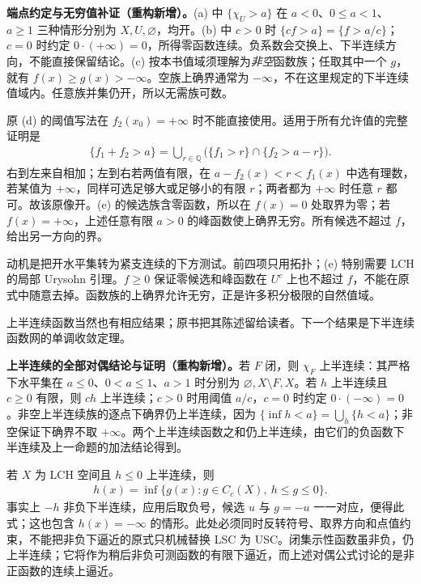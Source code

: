 \documentclass[../../main.tex]{subfiles}
\begin{document}
\begin{remark}
\textbf{端点约定与无穷值补证（重构新增）。}(a) 中 $\{\chi_U>a\}$ 在 $a<0$、$0\leqslant a<1$、$a\geqslant1$ 三种情形分别为 $X,U,\varnothing$，均开。(b) 中 $c>0$ 时 $\{cf>a\}=\{f>a/c\}$；$c=0$ 时约定 $0\cdot(+\infty)=0$，所得零函数连续。负系数会交换上、下半连续方向，不能直接保留结论。(c) 按本书值域须理解为\emph{非空}函数族；任取其中一个 $g$，就有 $f(x)\geqslant g(x)>-\infty$。空族上确界通常为 $-\infty$，不在这里规定的下半连续值域内。任意族并集仍开，所以无需族可数。

原 (d) 的阈值写法在 $f_2(x_0)=+\infty$ 时不能直接使用。适用于所有允许值的完整证明是
\begin{align*}
\{f_1+f_2>a\}=\bigcup_{r\in\mathbb Q}\bigl(\{f_1>r\}\cap\{f_2>a-r\}\bigr).
\end{align*}
右到左来自相加；左到右若两值有限，在 $a-f_2(x)<r<f_1(x)$ 中选有理数，若某值为 $+\infty$，同样可选足够大或足够小的有限 $r$；两者都为 $+\infty$ 时任意 $r$ 都可。故该原像开。(e) 的候选族含零函数，所以在 $f(x)=0$ 处取界为零；若 $f(x)=+\infty$，上述任意有限 $a>0$ 的峰函数使上确界无穷。所有候选不超过 $f$，给出另一方向的界。

动机是把开水平集转为紧支连续的下方测试。前四项只用拓扑；(e) 特别需要 LCH 的局部 Urysohn 引理。$f\geqslant0$ 保证零候选和峰函数在 $U^c$ 上也不超过 $f$，不能在原式中随意去掉。函数族的上确界允许无穷，正是许多积分极限的自然值域。
\end{remark}

上半连续函数当然也有相应结果；原书把其陈述留给读者。下一个结果是下半连续函数网的单调收敛定理。
\begin{remark}
\textbf{上半连续的全部对偶结论与证明（重构新增）。}若 $F$ 闭，则 $\chi_F$ 上半连续：其严格下水平集在 $a\leqslant0$、$0<a\leqslant1$、$a>1$ 时分别为 $\varnothing,X\setminus F,X$。若 $h$ 上半连续且 $c\geqslant0$ 有限，则 $ch$ 上半连续；$c>0$ 时用阈值 $a/c$，$c=0$ 时约定 $0\cdot(-\infty)=0$。非空上半连续族的逐点下确界仍上半连续，因为 $\{\inf h<a\}=\bigcup_h\{h<a\}$；非空保证下确界不取 $+\infty$。两个上半连续函数之和仍上半连续，由它们的负函数下半连续及上一命题的加法结论得到。

若 $X$ 为 LCH 空间且 $h\leqslant0$ 上半连续，则
\begin{align*}
h(x)=\inf\{g(x):g\in C_c(X),\ h\leqslant g\leqslant0\}.
\end{align*}
事实上 $-h$ 非负下半连续，应用后取负号，候选 $u$ 与 $g=-u$ 一一对应，便得此式；这也包含 $h(x)=-\infty$ 的情形。此处必须同时反转符号、取界方向和点值约束，不能把非负下逼近的原式只机械替换 LSC 为 USC。闭集示性函数虽非负，仍上半连续；它将作为稍后非负可测函数的有限下逼近，而上述对偶公式讨论的是非正函数的连续上逼近。
\end{remark}
\end{document}
